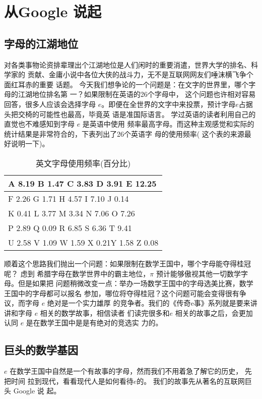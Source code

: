 %

\chapter{从Google 说起}

\section{字母的江湖地位}
对各类事物论资排辈理出个江湖地位是人们闲时的重要消遣，世界大学的排名、科学家的
贡献、金庸小说中各位大侠的战斗力，无不是互联网网友们唾沫横飞争个面红耳赤的重要
话题。 今天我们想争论的一个问题是：在文字的世界里，哪个字母的江湖地位排名第
一？如果限制在英语的26个字母中， 这个问题也许相对容易回答，很多人应该会选择字母
$e$。即便在全世界的文字中来投票，预计字母$e$占据头把交椅的可能性也最高，毕竟英
语是准国际语言。 学过英语的读者利用自己的直觉也不难感知到字母 $e$ 是英语中使用
频率最高字母。而这种主观感觉和实际的统计结果是非常符合的，下表列出了26个英语字
母的使用频率( 这个表的来源最好说明一下)。

\begin{table}[htbp]
\centering
\caption{英文字母使用频率(百分比)}
\begin{tabular}{|l|}
\hline
A 8.19 B 1.47 C 3.83 D 3.91 E 12.25      \\ \hline
F 2.26 G 1.71 H 4.57 I 7.10 J 0.14       \\ \hline
K 0.41 L 3.77 M 3.34 N 7.06 O 7.26       \\ \hline
P 2.89 Q 0.09 R 6.85 S 6.36 T 9.41       \\ \hline
U 2.58 V 1.09 W 1.59 X 0.21Y 1.58 Z 0.08 \\ \hline
\end{tabular}
\centering
\end{table}

顺着这个思路我们抛出一个问题：如果限制在数学王国中，哪个字母能夺得桂冠呢？ 虑到
希腊字母在数学世界中的霸主地位，$\pi$ 预计能够傲视其他一切数学字母。但是如果把
问题稍微改变一点：举办一场数学王国中的字母选美比赛，数学王国中的字母都可以报名
参加，哪位将夺得桂冠？这个问题可能会变得很有争议，而字母 $e$ 绝对是一个实力雄厚
的竞争者。我们的《传奇e事》系列就是要来讲讲和字母 $e$ 相关的数学故事，相信读者
们读完很多和$e$ 相关的故事之后，会更加认同 $e$ 是在数学王国中是是有绝对的竞选实
力的。 

\section{巨头的数学基因}
$e$ 在数学王国中自然是一个有故事的字母，然而我们不用着急了解它的历史， 先把时间
拉到现代，看看现代人是如何看待$e$的。 我们的故事先从著名的互联网巨头 Google 说
起。

